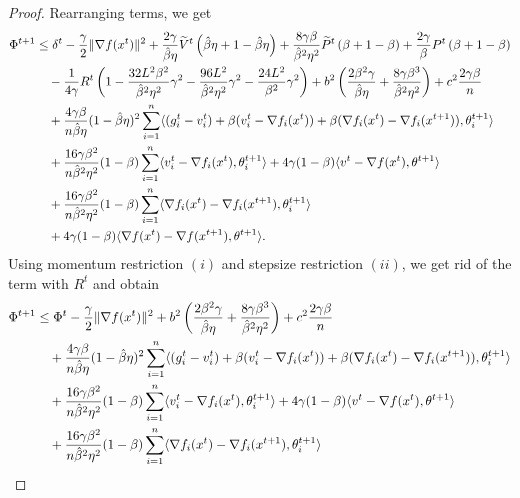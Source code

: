 \documentclass[a4paper,11pt]{article}
\begin{document}
\begin{proof}
    Rearranging terms, we get
    \begin{align*}
    \Phi^{t+1} &\le \delta^t 
    - \frac{\gamma}{2}\|\nabla f(x^t)\|^2
    + \frac{2\gamma}{\hat{\beta}\eta}\wtilde{V}^t\left(\hat{\beta}\eta + 1-\hat{\beta}\eta\right)
    + \frac{8\gamma\beta}{\hat{\beta}^2\eta^2}\wtilde{P}^t\left(\beta + 1 - \beta\right)
    + \frac{2\gamma}{\beta}P^t\left(\beta + 1-\beta\right)\\
    & \quad - \frac{1}{4\gamma}R^t\left(1 - \frac{32L^2\beta^2}{\hat\beta^2\eta^2}\gamma^2
    - \frac{96L^2}{\hat\beta^2\eta^2}\gamma^2
    - \frac{24L^2}{\beta^2}\gamma^2\right)
    + b^2\left(\frac{2\beta^2\gamma}{\hat{\beta}\eta} + \frac{8\gamma\beta^3}{\hat{\beta}^2\eta^2}\right)
    + c^2\frac{2\gamma\beta}{n}\\
    & \quad + \frac{4\gamma\beta}{n\hat{\beta}\eta}(1-\hat{\beta}\eta)^2\sum_{i=1}^n\<(g_i^{t} - v_i^{t}) + \beta(v_i^{t} - \nabla f_i(x^{t})) + \beta(\nabla f_i(x^{t})-\nabla f_i(x^{t+1})), \theta^{t+1}_i>\\
    &\quad + \frac{16\gamma\beta^2}{n\hat{\beta}^2\eta^2}(1-\beta)\sum_{i=1}^n\<v_i^t - \nabla f_i(x^{t}), \theta^{t+1}_i>
    + 4\gamma(1-\beta)\<v^t - \nabla f(x^{t}), \theta^{t+1}>\\
    &\quad + \frac{16\gamma\beta^2}{n\hat{\beta}^2\eta^2}(1-\beta)\sum_{i=1}^n\<\nabla f_i(x^t) - \nabla f_i(x^{t+1}), \theta^{t+1}_i>\\
    &\quad + 4\gamma(1-\beta)\<\nabla f(x^t) - \nabla f(x^{t+1}), \theta^{t+1}>.
    \end{align*}
    Using momentum restriction $(i)$ and stepsize restriction $(ii)$, we get rid of the term with $R^t$ and obtain
    \begin{align*}
        \Phi^{t+1} 
    &\le \Phi^t 
    - \frac{\gamma}{2}\|\nabla f(x^t)\|^2
    + b^2\left(\frac{2\beta^2\gamma}{\hat{\beta}\eta} + \frac{8\gamma\beta^3}{\hat{\beta}^2\eta^2}\right)
    + c^2\frac{2\gamma\beta}{n}\\
    & \quad + \frac{4\gamma\beta}{n\hat{\beta}\eta}(1-\hat{\beta}\eta)^2\sum_{i=1}^n\<(g_i^{t} - v_i^{t}) + \beta(v_i^{t} - \nabla f_i(x^{t})) + \beta(\nabla f_i(x^{t})-\nabla f_i(x^{t+1})), \theta^{t+1}_i>\\
    &\quad + \frac{16\gamma\beta^2}{n\hat{\beta}^2\eta^2}(1-\beta)\sum_{i=1}^n\<v_i^t - \nabla f_i(x^{t}), \theta^{t+1}_i>
    + 4\gamma(1-\beta)\<v^t - \nabla f(x^{t}), \theta^{t+1}>\\
    &\quad +\frac{16\gamma\beta^2}{n\hat{\beta}^2\eta^2}(1-\beta)\sum_{i=1}^n\<\nabla f_i(x^t) - \nabla f_i(x^{t+1}), \theta^{t+1}_i>\\

\end{align*}
\end{proof}
\end{document}
